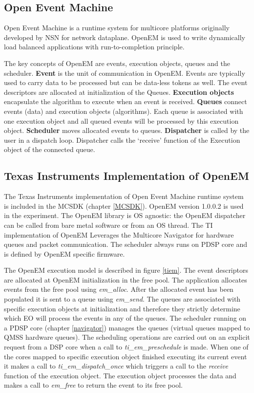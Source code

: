\subsection{Open Event Machine}
Open Event Machine is a runtime system for multicore platforms originally developed by NSN for network dataplane. OpenEM is used to write dynamically load balanced applications with run-to-completion principle.

The key concepts of OpenEM are events, execution objects, queues and the scheduler. \textbf{Event} is the unit of communication in OpenEM. Events are typically used to carry data to be processed but can be data-less tokens as well. The event descriptors are allocated at initialization of the Queues. \textbf{Execution objects} encapsulate the algorithm to execute when an event is received. \textbf{Queues} connect events (data) and execution objects (algorithms). Each queue is associated with one execution object and all queued events will be processed by this execution object. \textbf{Scheduler} moves allocated events to queues. \textbf{Dispatcher} is called by the user in a dispatch loop. Dispatcher calls the ‘receive’ function of the Execution object of the connected queue.

\subsection{Texas Instruments Implementation of OpenEM}
The Texas Instruments implementation of Open Event Machine runtime system is included in the MCSDK (chapter \ref{MCSDK}). OpenEM version 1.0.0.2 is used in the experiment. The OpenEM library is OS agnostic: the OpenEM dispatcher can be called from bare metal software or from an OS thread. The TI implementation of OpenEM Leverages the Multicore Navigator for hardware queues and packet communication. The scheduler always runs on PDSP core and is defined by OpenEM specific firmware.

The OpenEM execution model is described in figure \ref{tiem}. The event descriptors are allocated at OpenEM initialization in the free pool. The application allocates events from the free pool using \textit{em\_alloc}. After the allocated event has been populated it is sent to a queue using \textit{em\_send}. The queues are associated with specific execution objects at initialization and therefore they strictly determine which EO will process the events in any of the queues. The scheduler running on a PDSP core (chapter \ref{navigator}) manages the queues (virtual queues mapped to QMSS hardware queues). The scheduling operations are carried out on an explicit request from a DSP core when a call to \textit{ti\_em\_preschedule} is made. When one of the cores mapped to specific execution object finished executing its current event it makes a call to \textit{ti\_em\_dispatch\_once} which triggers a call to the \textit{receive} function of the execution object. The execution object processes the data and makes a call to \textit{em\_free} to return the event to its free pool.

